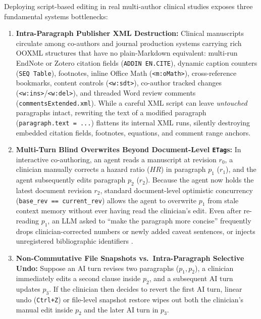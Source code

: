 \documentclass[11pt,a4paper]{article}
\begin{document}
Deploying script-based editing in real multi-author clinical studies exposes three fundamental systems bottlenecks:
\begin{enumerate}[leftmargin=1.5em,itemsep=2pt]
  \item \textbf{Intra-Paragraph Publisher XML Destruction:} Clinical manuscripts circulate among co-authors and journal production systems carrying rich OOXML structures that have no plain-Markdown equivalent: multi-run EndNote or Zotero citation fields (\texttt{ADDIN EN.CITE}), dynamic caption counters (\texttt{SEQ Table}), footnotes, inline Office Math (\texttt{<m:oMath>}), cross-reference bookmarks, content controls (\texttt{<w:sdt>}), co-author tracked changes (\texttt{<w:ins>}/\texttt{<w:del>}), and threaded Word review comments (\texttt{commentsExtended.xml}). While a careful XML script can leave \emph{untouched} paragraphs intact, rewriting the text of a modified paragraph (\texttt{paragraph.text = ...}) flattens its internal XML runs, silently destroying embedded citation fields, footnotes, equations, and comment range anchors.
  \item \textbf{Multi-Turn Blind Overwrites Beyond Document-Level \texttt{ETag}s:} In interactive co-authoring, an agent reads a manuscript at revision $r_0$, a clinician manually corrects a hazard ratio ($HR$) in paragraph $p_1$ ($r_1$), and the agent subsequently edits paragraph $p_2$ ($r_2$). Because the agent now holds the latest document revision $r_2$, standard document-level optimistic concurrency (\texttt{base\_rev == current\_rev}) allows the agent to overwrite $p_1$ from stale context memory without ever having read the clinician's edit. Even after re-reading $p_1$, an LLM asked to ``make the paragraph more concise'' frequently drops clinician-corrected numbers or newly added caveat sentences, or injects unregistered bibliographic identifiers \cite{walters2023fabrication}.
  \item \textbf{Non-Commutative File Snapshots vs.\ Intra-Paragraph Selective Undo:} Suppose an AI turn revises two paragraphs ($p_1, p_2$), a clinician immediately edits a second clause inside $p_2$, and a subsequent AI turn updates $p_3$. If the clinician then decides to revert the first AI turn, linear undo (\texttt{Ctrl+Z}) or file-level snapshot restore wipes out both the clinician's manual edit inside $p_2$ and the later AI turn in $p_3$.
\end{enumerate}
\end{document}
